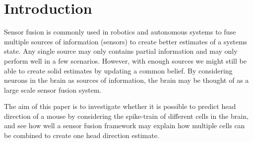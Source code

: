 \section{Introduction}
Sensor fusion is commonly used in robotics and autonomous systems to fuse multiple sources of information (sensors) to create better estimates of a systems state. Any single source may only contains partial information and may only perform well in a few scenarios. However, with enough sources we might still be able to create solid estimates by updating a common belief.  
By considering neurons in the brain as sources of information, the brain may be thought of as a large scale sensor fusion system.

The aim of this paper is to investigate whether it is possible to predict head direction of a mouse by considering the spike-train of different cells in the brain, and see how well a sensor fusion framework may explain how multiple cells can be combined to create one head direction estimate. 